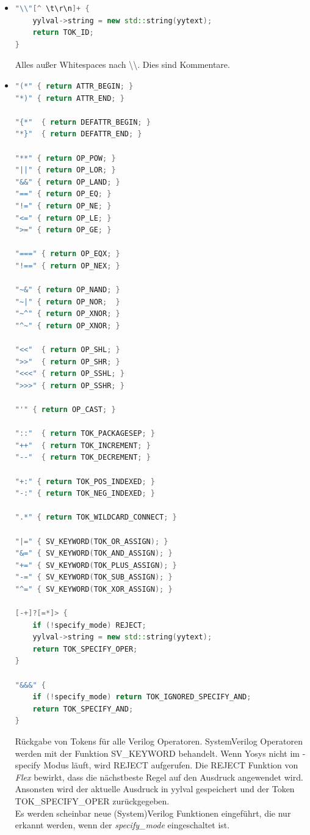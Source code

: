 \documentclass[11pt]{report}
\begin{document}
\begin{itemize}
\item
\begin{lstlisting}[language=C++]
"\\"[^ \t\r\n]+ {
	yylval->string = new std::string(yytext);
	return TOK_ID;
}
\end{lstlisting}
Alles außer Whitespaces nach \textbackslash \textbackslash. Dies sind Kommentare.

\item
\begin{lstlisting}[language=C++]
"(*" { return ATTR_BEGIN; }
"*)" { return ATTR_END; }

"{*"  { return DEFATTR_BEGIN; }
"*}"  { return DEFATTR_END; }

"**" { return OP_POW; }
"||" { return OP_LOR; }
"&&" { return OP_LAND; }
"==" { return OP_EQ; }
"!=" { return OP_NE; }
"<=" { return OP_LE; }
">=" { return OP_GE; }

"===" { return OP_EQX; }
"!==" { return OP_NEX; }

"~&" { return OP_NAND; }
"~|" { return OP_NOR;  }
"~^" { return OP_XNOR; }
"^~" { return OP_XNOR; }

"<<"  { return OP_SHL; }
">>"  { return OP_SHR; }
"<<<" { return OP_SSHL; }
">>>" { return OP_SSHR; }

"'" { return OP_CAST; }

"::"  { return TOK_PACKAGESEP; }
"++"  { return TOK_INCREMENT; }
"--"  { return TOK_DECREMENT; }

"+:" { return TOK_POS_INDEXED; }
"-:" { return TOK_NEG_INDEXED; }

".*" { return TOK_WILDCARD_CONNECT; }

"|=" { SV_KEYWORD(TOK_OR_ASSIGN); }
"&=" { SV_KEYWORD(TOK_AND_ASSIGN); }
"+=" { SV_KEYWORD(TOK_PLUS_ASSIGN); }
"-=" { SV_KEYWORD(TOK_SUB_ASSIGN); }
"^=" { SV_KEYWORD(TOK_XOR_ASSIGN); }

[-+]?[=*]> {
	if (!specify_mode) REJECT;
	yylval->string = new std::string(yytext);
	return TOK_SPECIFY_OPER;
}

"&&&" {
	if (!specify_mode) return TOK_IGNORED_SPECIFY_AND;
	return TOK_SPECIFY_AND;
}
\end{lstlisting}
Rückgabe von Tokens für alle Verilog Operatoren. SystemVerilog Operatoren werden mit der Funktion SV\_KEYWORD behandelt. 
Wenn Yosys nicht im -specify Modus läuft, wird REJECT aufgerufen.
Die REJECT Funktion von \textit{Flex} bewirkt, dass die nächstbeste Regel auf den Ausdruck angewendet wird.
Ansonsten wird der aktuelle Ausdruck in yylval gespeichert und der Token TOK\_SPECIFY\_OPER zurückgegeben.\\
Es werden scheinbar neue (System)Verilog Funktionen eingeführt, die nur erkannt werden, wenn der \textit{specify\_mode} eingeschaltet ist.



\end{itemize}
\end{document}
